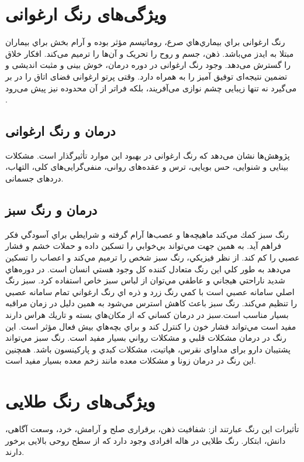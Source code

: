\documentclass[12pt]{report}
\begin{document}
\section{ویژگی‌های رنگ ارغوانی}
رنگ ارغوانی براي بيماري‌هاي صرع، روماتيسم مؤثر بوده و آرام بخش براي بيماران مبتلا به ايدز مي‌باشد. ذهن، جسم و روح را تحریک و آن‌ها را ترمیم می‌کند. افکار خلاق را گسترش می‌دهد. وجود رنگ ارغوانی در دوره درمان، خوش بینی و مثبت اندیشی و تضمین نتیجه‌ای توفیق آمیز را به همراه دارد. وقتی پرتو ارغوانی فضای اتاق را در بر می‌گیرد نه تنها زیبایی چشم نوازی می‌آفریند، بلکه فراتر از آن محدوده نیز پیش می‌رود .

\subsection{درمان و رنگ ارغوانی }
 پژوهش‌ها نشان می‌دهد که رنگ ارغوانی در بهبود این موارد تأثیرگذار است. مشکلات بینایی و شنوایی، حس بویایی، ترس و عقده‌های روانی، منفی‌گرایی‌های کلی، التهاب، درد‌های جسمانی.

\subsection{درمان و رنگ سبز}
رنگ سبز كمك مي‌كند ماهيچه‌ها و عصب‌ها آرام گرفته و شرايطي براي آسودگي فكر فراهم آيد. به همين جهت مي‌تواند بي‌خوابي را تسكين داده و حملات خشم و فشار عصبي را كم كند. از نظر فيزيكي، رنگ سبز شخص را ترميم مي‌كند و اعصاب را تسكين مي‌دهد به طور كلي اين رنگ متعادل كننده كل وجود هستي انسان است. در دوره‌هاي شديد ناراحتي هيجاني و عاطفي مي‌توان از لباس سبز خاص استفاده  كرد. سبز رنگ اصلي سامانه عصبي است با كمي رنگ زرد و ذره اي رنگ ارغواني تمام سامانه عصبي را تنظيم  مي‌كند. 
رنگ سبز باعث كاهش استرس مي‌شود به همين دليل در زمان مراقبه بسيار مناسب است.سبز در درمان كساني كه از مكان‌هاي بسته و تاريك هراس دارند مفيد است مي‌تواند فشار خون را كنترل كند و براي بچه‌هاي بيش فعال مؤثر است. اين رنگ در درمان مشكلات قلبي و مشكلات رواني بسيار مفيد است. رنگ سبز مي‌تواند پشتيبان دارو برای مداوای نقرس، هپاتيت، مشكلات كبدي و پاركينسون باشد. همچنين اين رنگ در درمان زونا و مشكلات معده مانند زخم معده بسيار مفيد است.

\section{ویژگی‌های رنگ طلایی }
تأثیرات این رنگ عبارتند از: شفافیت ذهن، برقراری صلح و آرامش، خرد، وسعت آگاهی، دانش، ابتکار.
رنگ طلایی در ‌هاله افرادی وجود دارد که از سطح روحی بالایی برخور دارند.
\end{document}
